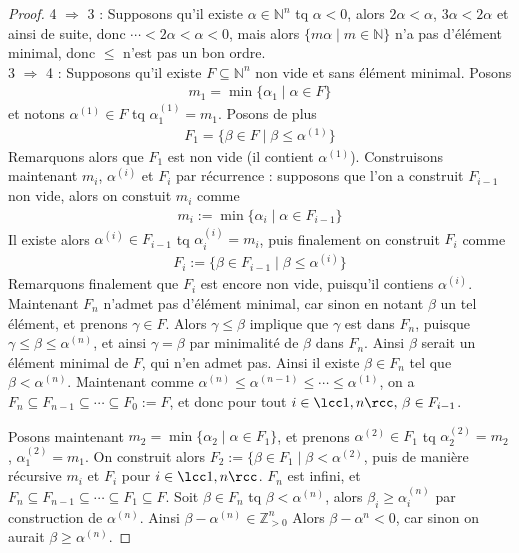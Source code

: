            \begin{proof}
                4 $\Rightarrow$ 3 : Supposons qu'il existe $\alpha \in \mathbb{N}^n$ tq $\alpha < 0$, alors $2\alpha < \alpha$, $3\alpha < 2\alpha$ et ainsi de suite, donc $\cdots < 2\alpha < \alpha < 0$, mais alors $\{m\alpha \mid m \in \mathbb{N}\}$ n'a pas d'élément minimal, donc $\leq$ n'est pas un bon ordre. \\
                3 $\Rightarrow$ 4 : Supposons qu'il existe $F \subseteq \mathbb{N}^n$ non vide et sans élément minimal. Posons 
                \begin{align*}
                    m_1 = \min \{\alpha_1 \mid \alpha \in F\}
                \end{align*}
                et notons $\alpha^{(1)} \in F$ tq $\alpha^{(1)}_1 = m_1$. Posons de plus
                \begin{align*}
                    F_1 = \{\beta \in F \mid \beta \leq \alpha^{(1)}\}
                \end{align*}
                Remarquons alors que $F_1$ est non vide (il contient $\alpha^{(1)}$). Construisons maintenant $m_i$, $\alpha^{(i)}$ et $F_i$ par récurrence : supposons que l'on a construit $F_{i-1}$ non vide, alors on constuit $m_i$ comme
                \begin{align*}
                    m_i := \min \{\alpha_i \mid \alpha \in F_{i-1}\}
                \end{align*}
                Il existe alors $\alpha^{(i)} \in F_{i-1}$ tq $\alpha^{(i)}_i = m_i$, puis finalement on construit $F_i$ comme
                \begin{align*}
                    F_i := \{\beta \in F_{i-1} \mid \beta \leq \alpha^{(i)}\}
                \end{align*}
                Remarquons finalement que $F_i$ est encore non vide, puisqu'il contiens $\alpha^{(i)}$. Maintenant $F_n$ n'admet pas d'élément minimal, car sinon en notant $\beta$ un tel élément, et prenons $\gamma \in F$. Alors $\gamma \leq \beta$ implique que $\gamma$ est dans $F_n$, puisque $\gamma \leq \beta \leq \alpha^{(n)}$, et ainsi $\gamma = \beta$ par minimalité de $\beta$ dans $F_n$. Ainsi $\beta$ serait un élément minimal de $F$, qui n'en admet pas. Ainsi il existe $\beta \in F_n$ tel que $\beta < \alpha^{(n)}$. Maintenant comme $\alpha^{(n)} \leq \alpha^{(n-1)} \leq \cdots \leq \alpha^{(1)}$, on a $F_n \subseteq F_{n-1} \subseteq \cdots \subseteq F_0 := F$, et donc pour tout $i \in \lcc 1,n \rcc ,\, \beta \in F_{i-1}$. 

                Posons maintenant $m_2 = \min \{\alpha_2 \mid \alpha \in F_1\}$, et prenons $\alpha^{(2)} \in F_1$ tq $\alpha_2^{(2)} = m_2$, $\alpha_1^{(2)} = m_1$. On construit alors $F_2 := \{\beta \in F_1 \mid \beta < \alpha^{(2)}$, puis de manière récursive $m_i$ et $F_i$ pour $i \in \lcc 1,n \rcc$. $F_n$ est infini, et $F_n \subseteq F_{n-1} \subseteq \cdots \subseteq F_1 \subseteq F$. Soit $\beta \in F_n$ tq $\beta < \alpha^{(n)}$, alors $\beta_i \geq \alpha_i^{(n)}$ par construction de $\alpha^{(n)}$. Ainsi $\beta - \alpha^{(n)} \in \mathbb{Z}^n_{> 0}$ Alors $\beta - \alpha^n < 0$, car sinon on aurait $\beta \geq \alpha^{(n)}$. 
            \end{proof} 

